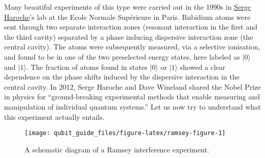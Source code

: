 \documentclass[fleqn]{article}
\begin{document}
Many beautiful experiments of this type were carried out in the 1990s in \href{https://en.wikipedia.org/wiki/Serge_Haroche}{Serge Haroche}'s lab at the Ecole Normale Supérieure in Paris.
Rubidium atoms were sent through two separate interaction zones (resonant interaction in the first and the third cavity) separated by a phase inducing dispersive interaction zone (the central cavity).
The atoms were subsequently measured, via a selective ionisation, and found to be in one of the two preselected energy states, here labeled as \(|0\rangle\) and \(|1\rangle\).
The fraction of atoms found in states \(|0\rangle\) or \(|1\rangle\) showed a clear dependence on the phase shifts induced by the dispersive interaction in the central cavity.
In 2012, Serge Haroche and Dave Wineland shared the Nobel Prize in physics for ``ground-breaking experimental methods that enable measuring and manipulation of individual quantum systems.''
Let us now try to understand what this experiment actually entails.



\begin{figure}[H]

{\centering \texttt{[image: qubit\_guide\_files/figure-latex/ramsey-figure-1]} 

}

\caption{A schematic diagram of a Ramsey interference experiment.}\label{fig:ramsey-figure}
\end{figure}
\end{document}
